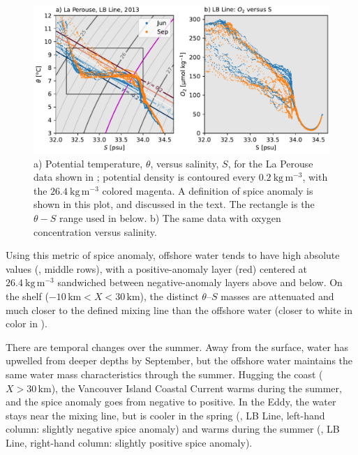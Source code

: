 \documentclass[draft]{agujournal2019}
\newcommand*{\Eddy}{{\sc Eddy}}
\begin{document}
\begin{figure}[htbp]
  \begin{center}
     \includegraphics[width=5in]{LaPerouse2013TS}
     \caption{a) Potential temperature, $\theta$, versus salinity, $S$, for the La Perouse data shown in ; potential density is contoured every $0.2\ \mathrm{kg\,m^{-3}}$, with the $26.4\ \mathrm{kg\,m^{-3}}$ colored magenta. A definition of spice anomaly is shown in this plot, and discussed in the text.  The rectangle is the $\theta-S$ range used in  below. b) The same data with oxygen concentration versus salinity.}
     \label{fig:LaPerouse2013TS}
  \end{center}
\end{figure}

Using this metric of spice anomaly, offshore water tends to have high absolute values (, middle rows), with a positive-anomaly layer (red) centered at $26.4\ \mathrm{kg\,m^{-3}}$ sandwiched between negative-anomaly layers above and below.  On the shelf ($-10\, \mathrm{km} < X < 30\, \mathrm{km}$), the distinct $\theta$--$S$ masses are attenuated and much closer to the defined mixing line than the offshore water (closer to white in color in ).

There are temporal changes over the summer.  Away from the surface, water has upwelled from deeper depths by September, but the offshore water maintains the same water mass characteristics through the summer.  Hugging the coast ($X > 30\, \mathrm{km}$), the Vancouver Island Coastal Current warms during the summer, and the spice anomaly goes from negative to positive.  In the \Eddy, the water stays near the mixing line, but is cooler in the spring (, LB Line, left-hand column: slightly negative spice anomaly) and warms during the summer (, LB Line, right-hand column: slightly positive spice anomaly).
\end{document}
